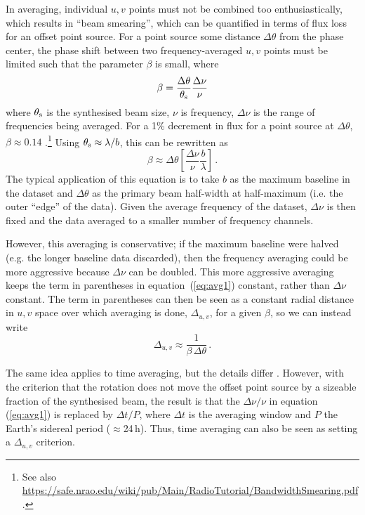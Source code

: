 \documentclass[fleqn,usenatbib]{mnras}
\begin{document}
In averaging, individual $u,v$ points must not be combined too enthusiastically, which results in ``beam smearing'', which can be quantified in terms of flux loss for an offset point source. For a point source some distance $\Delta \theta$ from the phase center, the phase shift between two frequency-averaged $u,v$ points must be limited such that the parameter $\beta$ is small, where
\begin{equation}
    \beta = \frac{\Delta \theta}{\theta_{\rm s}} \frac{\Delta \nu}{\nu}
\end{equation}
where $\theta_{\rm s}$ is the synthesised beam size, $\nu$ is frequency, $\Delta \nu$ is the range of frequencies being averaged. For a 1\% decrement in flux for a point source at $\Delta \theta$, $\beta \approx 0.14$ \citep{1989ASPC....6..247B}.\footnote{See also \href{https://safe.nrao.edu/wiki/pub/Main/RadioTutorial/BandwidthSmearing.pdf}{https://safe.nrao.edu/wiki/pub/Main/RadioTutorial/BandwidthSmearing.pdf}.} Using $\theta_{\rm s} \approx \lambda/b$, this can be rewritten as
\begin{equation}\label{eq:avg1}
    \beta \approx \Delta \theta \left[ \frac{\Delta \nu}{\nu} \frac{b}{\lambda} \right] \, .
\end{equation}
The typical application of this equation is to take $b$ as the maximum baseline in the dataset and $\Delta \theta$ as the primary beam half-width at half-maximum (i.e. the outer ``edge'' of the data). Given the average frequency of the dataset, $\Delta \nu$ is then fixed and the data averaged to a smaller number of frequency channels.

However, this averaging is conservative; if the maximum baseline were halved (e.g. the longer baseline data discarded), then the frequency averaging could be more aggressive because $\Delta \nu$ can be doubled. This more aggressive averaging keeps the term in parentheses in equation~(\ref{eq:avg1}) constant, rather than $\Delta \nu$ constant. The term in parentheses can then be seen as a constant radial distance in $u,v$ space over which averaging is done, $\Delta_{u,v}$, for a given $\beta$, so we can instead write
\begin{equation}\label{eq:avg2}
    \Delta_{u,v} \approx \frac{1}{\beta \, \Delta \theta} \, .
\end{equation}

The same idea applies to time averaging, but the details differ \citep{1989ASPC....6..247B}. However, with the criterion that the rotation does not move the offset point source by a sizeable fraction of the synthesised beam, the result is that the $\Delta \nu / \nu$ in equation (\ref{eq:avg1}) is replaced by $\Delta t / P$, where $\Delta t$ is the averaging window and $P$ the Earth's sidereal period ($\approx$24\,h). Thus, time averaging can also be seen as setting a $\Delta_{u,v}$ criterion.
\end{document}
